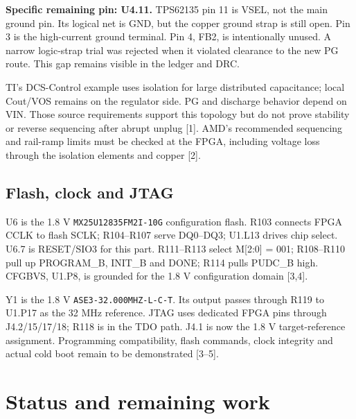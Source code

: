 \documentclass[11pt,a4paper]{article}
\begin{document}
\textbf{Specific remaining pin: U4.11.} TPS62135 pin 11 is VSEL, not the main ground pin. Its logical net is GND, but the copper ground strap is still open. Pin 3 is the high-current ground terminal. Pin 4, FB2, is intentionally unused. A narrow logic-strap trial was rejected when it violated clearance to the new PG route. This gap remains visible in the ledger and DRC.

TI's DCS-Control example uses isolation for large distributed capacitance; local Cout/VOS remains on the regulator side. PG and discharge behavior depend on VIN. Those source requirements support this topology but do not prove stability or reverse sequencing after abrupt unplug [1]. AMD's recommended sequencing and rail-ramp limits must be checked at the FPGA, including voltage loss through the isolation elements and copper [2].
\subsection{Flash, clock and JTAG}
U6 is the 1.8 V \nolinkurl{MX25U12835FM2I-10G} configuration flash. R103 connects FPGA CCLK to flash SCLK; R104--R107 serve DQ0--DQ3; U1.L13 drives chip select. U6.7 is RESET/SIO3 for this part. R111--R113 select M[2:0] = 001; R108--R110 pull up PROGRAM\_B, INIT\_B and DONE; R114 pulls PUDC\_B high. CFGBVS, U1.P8, is grounded for the 1.8 V configuration domain [3,4].

Y1 is the 1.8 V \nolinkurl{ASE3-32.000MHZ-L-C-T}. Its output passes through R119 to U1.P17 as the 32 MHz reference. JTAG uses dedicated FPGA pins through J4.2/15/17/18; R118 is in the TDO path. J4.1 is now the 1.8 V target-reference assignment. Programming compatibility, flash commands, clock integrity and actual cold boot remain to be demonstrated [3--5].
\clearpage\section{Status and remaining work}
\end{document}
